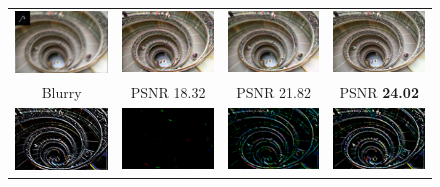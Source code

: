 \documentclass[10pt,twocolumn,letterpaper]{article}
\begin{document}
	\begin{figure}[h]
		\centering
		\setlength\tabcolsep{1pt}
		\begin{tabular}{cccc}
			\includegraphics[width=0.24\linewidth]{manmade2blurryp}&\includegraphics[width=0.24\linewidth]{manmade2FCN}&\includegraphics[width=0.24\linewidth]{manmade2DIP}&\includegraphics[width=0.24\linewidth]{manmade2DRP}\\
			Blurry&PSNR 18.32&PSNR 21.82&PSNR \textbf {24.02}\\
			\includegraphics[width=0.24\linewidth]{manmade2res}&\includegraphics[width=0.24\linewidth]{manmade2FCNres}&\includegraphics[width=0.24\linewidth]{manmade2DIPres}&\includegraphics[width=0.24\linewidth]{manmade2DRPres}\\

\end{tabular}
\end{figure}
\end{document}
